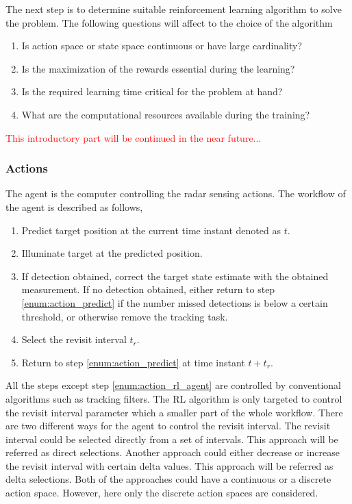 \documentclass[english, 12pt, a4paper, elec, utf8, a-1b, online]{aaltothesis}
\begin{document}
The next step is to determine suitable reinforcement learning algorithm to solve the problem.
The following questions will affect to the choice of the algorithm
\begin{enumerate}
    \item Is action space or state space continuous or have large cardinality? \label{enum:question_spaces}
    \item Is the maximization of the rewards essential during the learning? \label{enum:on_off_policy}
    \item Is the required learning time critical for the problem at hand? \label{enum:question_learning_speed}
    \item What are the computational resources available during the training? \label{enum:question_resources}
\end{enumerate}
\textcolor{red}{This introductory part will be continued in the near future...}

\subsubsection{Actions} \label{sec:actions}

The agent is the computer controlling the radar sensing actions.
The workflow of the agent is described as follows,
\begin{enumerate}
    \item Predict target position at the current time instant denoted as $t$. \label{enum:action_predict}
    \item Illuminate target at the predicted position.
    \item If detection obtained, correct the target state estimate with the obtained measurement. If no detection obtained, either return to step \ref{enum:action_predict} if the number missed detections is below a certain threshold, or otherwise remove the tracking task.
    \item Select the revisit interval $t_r$. \label{enum:action_rl_agent}
    \item Return to step \ref{enum:action_predict} at time instant $t+t_r$.
\end{enumerate}
All the steps except step \ref{enum:action_rl_agent} are controlled by conventional algorithms such as tracking filters.
The RL algorithm is only targeted to control the revisit interval parameter which a smaller part of the whole workflow.
There are two different ways for the agent to control the revisit interval.
The revisit interval could be selected directly from a set of intervals.
This approach will be referred as direct selections.
Another approach could either decrease or increase the revisit interval with certain delta values.
This approach will be referred as delta selections.
Both of the approaches could have a continuous or a discrete action space.
However, here only the discrete action spaces are considered.
\end{document}
